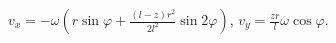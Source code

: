 $v_x= -\omega\left( r\sin{\varphi}+\frac{(l-z)r^2}{2l^2}\sin{2\varphi}\right)$,
$v_y = \frac{zr}{l}\omega\cos{\varphi}$.
